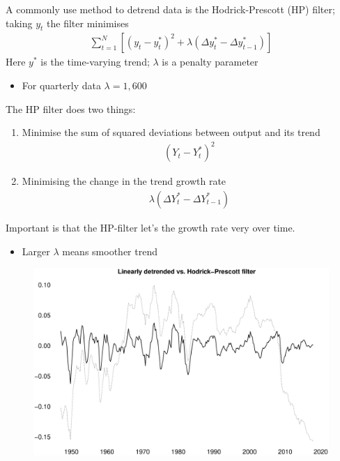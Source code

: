 \documentclass{beamer}
\begin{document}
\begin{frame}
 A commonly use method to detrend data is the Hodrick-Prescott (HP) filter; taking $y_t$ the filter minimises
\begin{align}
 \sum_{t=1}^{N} [(y_t - y_t^*)^2+ \lambda(\Delta y_t^* - \Delta y_{t-1}^*)]
\end{align}
\medskip
Here $y^*$ is the time-varying trend; $\lambda$ is a penalty parameter
\begin{itemize}
  \item For quarterly data $\lambda=1,600$
\end{itemize}
\end{frame}

\begin{frame}
  The HP filter does two things:
  \begin{enumerate}
    \item Minimise the sum of squared deviations between output and its trend
    \begin{align}
      (Y_t - Y_t^*)^2
    \end{align}
    \item Minimising the change in the trend growth rate
    \begin{align}
      \lambda(\Delta Y_t^* - \Delta Y_{t-1}^*)
    \end{align}
  \end{enumerate}
  \medskip
  Important is that the HP-filter let's the growth rate very over time.
  \begin{itemize}
    \item Larger $\lambda$ means smoother trend
  \end{itemize}
\end{frame}

\begin{frame}
  \begin{figure}
    \includegraphics[scale=.25]{hp_filter.eps}
  \end{figure}
\end{frame}
\end{document}
